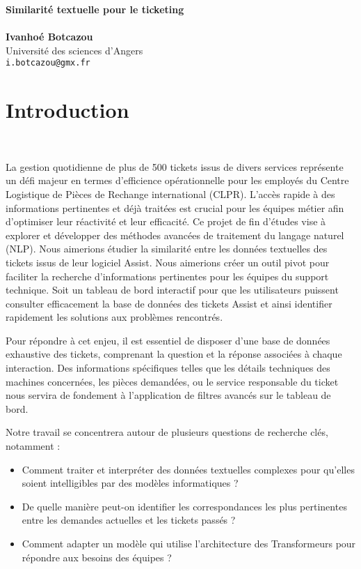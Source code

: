 \documentclass[12pt]{article}
\makeatletter
\newcommand{\titlePage}{
		\begin{center}
			\noindent\makebox[\linewidth]{\rule{\textwidth}{4pt}} 
			\Huge\textbf{\sc Similarité textuelle pour le ticketing}\\[-0.25cm]
			\noindent\makebox[\linewidth]{\rule{\textwidth}{2pt}} 
			\hfill\\[1cm]
			\vspace*{4pt}
			\large \textbf{Ivanhoé Botcazou}\\
			\large Université des sciences d'Angers \\
			\texttt{i.botcazou@gmx.fr}\\[2cm]
		\end{center}
}
\theoremstyle{definition}
\makeatother
\begin{document}
	
	\titlePage %
	\tableofcontents
	\section{Introduction}\quad\\[-0.5cm]
	
	 \par La gestion quotidienne de plus de 500 tickets issus de divers services représente un défi majeur en termes d'efficience opérationnelle pour les employés du Centre Logistique de Pièces de Rechange international (CLPR). L'accès rapide à des informations pertinentes et déjà traitées est crucial pour les équipes métier afin d'optimiser leur réactivité et leur efficacité. Ce projet de fin d'études vise à explorer et développer des méthodes avancées de traitement du langage naturel (NLP). Nous aimerions étudier la similarité entre les données textuelles des tickets issus de leur logiciel Assist. Nous aimerions créer un outil pivot pour faciliter la recherche d'informations pertinentes pour les équipes du support technique. Soit un tableau de bord interactif pour que les utilisateurs puissent consulter efficacement la base de données des tickets Assist et ainsi identifier rapidement les solutions aux problèmes rencontrés.
	
	Pour répondre à cet enjeu, il est essentiel de disposer d'une base de données exhaustive des tickets, comprenant la question et la réponse associées à chaque interaction. Des informations spécifiques telles que les détails techniques des machines concernées, les pièces demandées, ou le service responsable du ticket nous servira de fondement à l'application de filtres avancés sur le tableau de bord.
	
	Notre travail se concentrera autour de plusieurs questions de recherche clés, notamment : 
		\begin{itemize}[-]
		\item Comment traiter et interpréter des données textuelles complexes pour qu'elles soient intelligibles par des modèles informatiques ? 
		\item De quelle manière peut-on identifier les correspondances les plus pertinentes entre les demandes actuelles et les tickets passés ? 
		\item Comment adapter un modèle qui utilise l'architecture des Transformeurs pour répondre aux besoins des équipes ? 
	\end{itemize}
	
\end{document}

